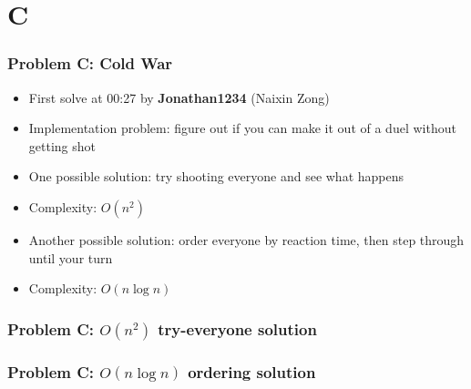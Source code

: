 \section{C}%
\label{sec:c}

\begin{frame}
  \frametitle{Problem C: Cold War}

  \begin{itemize}
    \item First solve at 00:27 by \textbf{Jonathan1234} (Naixin Zong)
    \item Implementation problem: figure out if you can make it out of a duel without getting shot
    \item One possible solution: try shooting everyone and see what happens 
    \item Complexity: $O(n^2)$
    \item Another possible solution: order everyone by reaction time, then step through until your turn
    \item Complexity: $O(n \log n)$
  \end{itemize}

\end{frame}

\begin{frame}
  \frametitle{Problem C: $O(n^2)$ try-everyone solution}
\end{frame}

\begin{frame}
  \frametitle{Problem C: $O(n \log n)$ ordering solution}
\end{frame}
